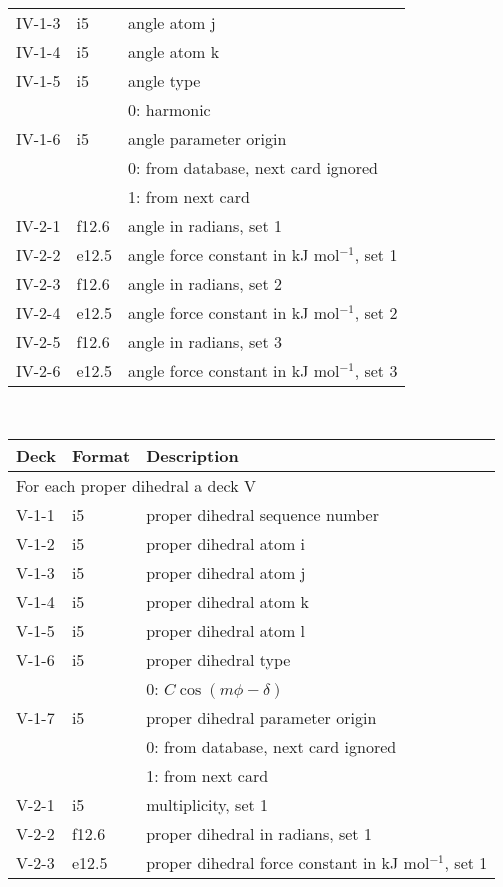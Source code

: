 \begin{center}
\begin{tabular*}{150mm}{p{12mm}p{12mm}l}
IV-1-3 & i5     & angle atom j \\
IV-1-4 & i5     & angle atom k \\
IV-1-5 & i5     & angle type \\
       &        & 0: harmonic\\
IV-1-6 & i5     & angle parameter origin\\
       &        & 0: from database, next card ignored \\
       &        & 1: from next card\\
IV-2-1 & f12.6  & angle in radians, set 1\\
IV-2-2 & e12.5  & angle force constant in kJ mol$^{-1}$, set 1 \\
IV-2-3 & f12.6  & angle in radians, set 2\\
IV-2-4 & e12.5  & angle force constant in kJ mol$^{-1}$, set 2 \\
IV-2-5 & f12.6  & angle in radians, set 3\\
IV-2-6 & e12.5  & angle force constant in kJ mol$^{-1}$, set 3 \\
\hline
\end{tabular*}\\
\begin{tabular*}{150mm}{p{12mm}p{12mm}l}
\hline\hline
Deck & Format & Description \\ \hline
\multicolumn{3}{l}{For each proper dihedral a deck V} \\
V-1-1 & i5     & proper dihedral sequence number \\
V-1-2 & i5     & proper dihedral atom i \\
V-1-3 & i5     & proper dihedral atom j \\
V-1-4 & i5     & proper dihedral atom k \\
V-1-5 & i5     & proper dihedral atom l \\
V-1-6 & i5     & proper dihedral type \\
      &        & 0: $C\cos(m\phi-\delta)$\\
V-1-7 & i5     & proper dihedral parameter origin\\
      &        & 0: from database, next card ignored \\
      &        & 1: from next card\\
V-2-1 & i5     & multiplicity, set 1\\
V-2-2 & f12.6  & proper dihedral in radians, set 1\\
V-2-3 & e12.5  & proper dihedral force constant in kJ mol$^{-1}$, set 1 \\

\end{tabular*}
\end{center}
